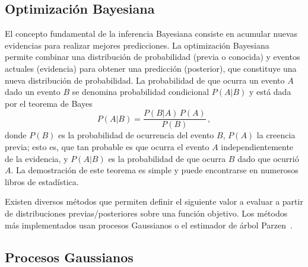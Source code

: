 \subsection{Optimización Bayesiana}
\label{sec:gaussianprocess}


El concepto fundamental de la inferencia Bayesiana consiste en acumular 
nuevas evidencias para realizar mejores predicciones. La optimización 
Bayesiana~\cite{Gelman:13,Barber:12} permite combinar una distribución 
de probabilidad (previa o conocida) y eventos actuales (evidencia) para 
obtener una predicción (posterior), que constituye una nueva 
distribución de probabilidad. La probabilidad de que ocurra un evento 
$A$ dado un evento $B$ se denomina probabilidad condicional $P(A|B)$ y 
está dada por el teorema de Bayes 
\begin{equation}
P(A|B)=\frac{P(B|A)\,P(A)}{P(B)}\,,
\end{equation}
donde $P(B)$ es la probabilidad de ocurrencia del evento $B$, $P(A)$ la
creencia previa; esto es, que tan probable es que ocurra el evento $A$
independientemente de la evidencia, y $P(A|B)$ es la probabilidad de que
ocurra $B$ dado que ocurrió $A$. La demostración de este teorema es 
simple y puede encontrarse en numerosos libros de estadística. 

Existen diversos métodos que permiten definir el siguiente valor a 
evaluar a partir de distribuciones previas/posteriores sobre una función 
objetivo. Los métodos más implementados usan procesos Gaussianos o el 
estimador de árbol Parzen~\cite{Bergstra:11}.

\subsection{Procesos Gaussianos}

